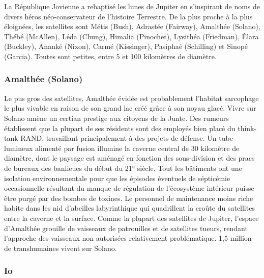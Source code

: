                                                                La République Jovienne a rebaptisé les lunes de Jupiter en s'inspirant de noms de divers héros néo-conservateur de l'histoire Terrestre. De la plus proche à la plus éloignées, les satellites sont Métis (Bush), Adrastée (Fairway), Amalthée (Solano), Thébé (McAllen), Léda (Chung), Himalia (Pinochet), Lysithéa (Friedman), Élara (Buckley), Ananké (Nixon), Carmé (Kissinger), Pasiphaé (Schilling) et Sinopé (Garcia). Toutes sont petites, entre 5 et 100 kilomètres de diamètre. 

                                                               \subsubsection{Amalthée (Solano)} \label{sec:amalthea-solano} 

                                                               Le pus gros des satellites, Amalthée évidée est probablement l'habitat sarcophage le plus vivable en raison de son grand lac créé grâce à son noyau glacé. Vivre sur Solano amène un certian prestige aux citoyens de la Junte. Des rumeurs établissent que la plupart de ses résidents sont des employés bien placé du think-tank RAND, travaillant principalement à des projets de défense. Un tube lumineux alimenté par fusion illumine la caverne central de 30 kilomètre de diamètre, dont le paysage est aménagé en fonction des sous-division et des pracs de bureaux des banlieues du début du 21° siècle. Tout les bâtiments ont une isolation environnementale pour que les épisodes éventuels de sépticémie occasionnelle résultant du manque de régulation de l'écosystème intérieur puisse être purgé par des bombes de toxines. Le personnel de maintenance moins riche habite dans les nid d'abeilles labyrinthique qui quadrillent la croûte du satellites entre la caverne et la surface. Comme la plupart des satellites de Jupiter, l'espace d'Amalthée grouille de vaisseaux de patrouilles et de satellites tueurs, rendant l'approche des vaisseaux non autorisées relativement problématique. 1,5 million de transhumaines vivent sur Solano. 

                                                               \subsubsection{Io} \label{sec:io} 

